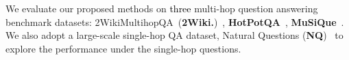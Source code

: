 
We evaluate our proposed methods on \textcolor{black}{three} multi-hop question answering benchmark datasets: 2WikiMultihopQA~(\textbf{2Wiki.})~\citep{ho2020constructing}, \textbf{HotPotQA}~\citep{yang2018hotpotqa}, \textbf{MuSiQue}~\citep{trivedi2022musique}.
We also adopt a large-scale single-hop QA dataset, Natural Questions (\textbf{NQ})~\citep{kwiatkowski2019natural} to explore the performance under the single-hop questions.